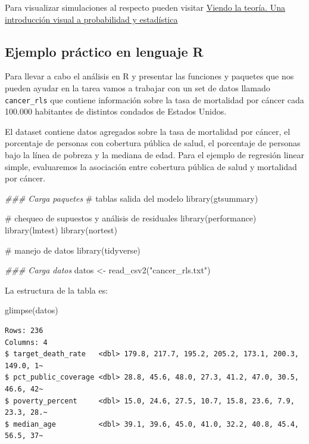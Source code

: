 \documentclass[
  letterpaper,
  DIV=11,
  numbers=noendperiod]{scrartcl}
\newenvironment{Shaded}{\begin{snugshade}}{\end{snugshade}}
\newcommand{\CommentTok}[1]{\textcolor[rgb]{0.37,0.37,0.37}{#1}}
\newcommand{\DocumentationTok}[1]{\textcolor[rgb]{0.37,0.37,0.37}{\textit{#1}}}
\newcommand{\FunctionTok}[1]{\textcolor[rgb]{0.28,0.35,0.67}{#1}}
\newcommand{\NormalTok}[1]{\textcolor[rgb]{0.00,0.23,0.31}{#1}}
\newcommand{\OtherTok}[1]{\textcolor[rgb]{0.00,0.23,0.31}{#1}}
\newcommand{\StringTok}[1]{\textcolor[rgb]{0.13,0.47,0.30}{#1}}
\begin{document}
Para visualizar simulaciones al respecto pueden visitar
\href{https://seeing-theory.brown.edu/regression-analysis/es.html\#section1}{Viendo
la teoría. Una introducción visual a probabilidad y estadística}

\subsection{Ejemplo práctico en lenguaje
R}\label{ejemplo-pruxe1ctico-en-lenguaje-r}

Para llevar a cabo el análisis en R y presentar las funciones y paquetes
que nos pueden ayudar en la tarea vamos a trabajar con un set de datos
llamado \texttt{cancer\_rls} que contiene información sobre la tasa de
mortalidad por cáncer cada 100.000 habitantes de distintos condados de
Estados Unidos.

El dataset contiene datos agregados sobre la tasa de mortalidad por
cáncer, el porcentaje de personas con cobertura pública de salud, el
porcentaje de personas bajo la línea de pobreza y la mediana de edad.
Para el ejemplo de regresión linear simple, evaluaremos la asociación
entre cobertura pública de salud y mortalidad por cáncer.

\begin{Shaded}
\begin{Highlighting}[]
\DocumentationTok{\#\#\# Carga paquetes}
\CommentTok{\# tablas salida del modelo}
\FunctionTok{library}\NormalTok{(gtsummary)}

\CommentTok{\# chequeo de supuestos y análisis de residuales}
\FunctionTok{library}\NormalTok{(performance)}
\FunctionTok{library}\NormalTok{(lmtest) }
\FunctionTok{library}\NormalTok{(nortest)}

\CommentTok{\# manejo de datos}
\FunctionTok{library}\NormalTok{(tidyverse) }


\DocumentationTok{\#\#\# Carga datos}
\NormalTok{datos }\OtherTok{\textless{}{-}} \FunctionTok{read\_csv2}\NormalTok{(}\StringTok{"cancer\_rls.txt"}\NormalTok{)}
\end{Highlighting}
\end{Shaded}

La estructura de la tabla es:

\begin{Shaded}
\begin{Highlighting}[]
\FunctionTok{glimpse}\NormalTok{(datos)}
\end{Highlighting}
\end{Shaded}

\begin{verbatim}
Rows: 236
Columns: 4
$ target_death_rate   <dbl> 179.8, 217.7, 195.2, 205.2, 173.1, 200.3, 149.0, 1~
$ pct_public_coverage <dbl> 28.8, 45.6, 48.0, 27.3, 41.2, 47.0, 30.5, 46.6, 42~
$ poverty_percent     <dbl> 15.0, 24.6, 27.5, 10.7, 15.8, 23.6, 7.9, 23.3, 28.~
$ median_age          <dbl> 39.1, 39.6, 45.0, 41.0, 32.2, 40.8, 45.4, 56.5, 37~
\end{verbatim}
\end{document}
